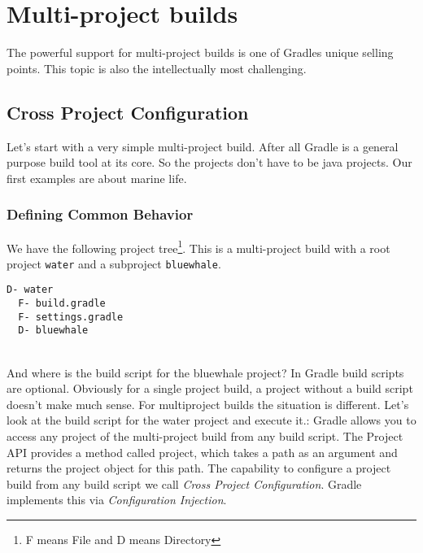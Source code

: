 \chapter{Multi-project builds} %
\label{cha:multi_project_builds}

The powerful support for multi-project builds is one of Gradles unique selling points. This topic is also the intellectually most challenging.
\section{Cross Project Configuration} %
\label{sec:cross_project_configuration}
Let's start with a very simple multi-project build. After all Gradle is a general purpose build tool at its core. So the projects don't have to be java projects. Our first examples are about marine life. 

\subsection{Defining Common Behavior} %
\label{sub:defining_common_behavior}
We have the following project tree\footnote{F means File and D means Directory}. This is a multi-project build with a root project \texttt{water} and a subproject \texttt{bluewhale}.

\begin{minipage}[t]{7cm}
\begin{Verbatim}[frame=single,label=Project Tree]
D- water
  F- build.gradle
  F- settings.gradle
  D- bluewhale	
\end{Verbatim}
\end{minipage}	
\begin{minipage}[t]{9cm}
\end{minipage}
\\

\noindent And where is the build script for the bluewhale project? In Gradle build scripts are optional. Obviously for a single project build, a project without a build script doesn't make much sense. For multiproject builds the situation is different. Let's look at the build script for the water project and execute it.:
Gradle allows you to access any project of the multi-project build from any build script. The Project API provides a method called project, which takes a path as an argument and returns the project object for this path. The capability to configure a project build from any build script we call \emph{Cross Project Configuration}. Gradle implements this via \emph{Configuration Injection}.


